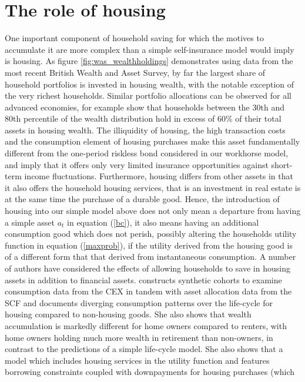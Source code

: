 \section{The role of housing}\label{housing}
One important component of household saving for which the motives to accumulate
it are more complex than a simple self-insurance model would imply is housing. 
As figure \ref{fig:was_wealthholdings} demonstrates using data from the most 
recent British Wealth and Asset Survey, by far the largest share of household
portfolios is invested in housing wealth, with the notable exception of the
very richest households. Similar portfolio allocations can be observed for all
advanced economies, \citet{FernandezVillaverdeKrueger2011} for example show that
households between the 30th and 80th percentile of the wealth distribution hold
in excess of 60\% of their total assets in housing wealth. The illiquidity of 
housing, the high transaction costs and the consumption element of housing 
purchases make this asset fundamentally different from the one-period riskless 
bond considered in our workhorse model, and imply that it offers only very limited
insurance opportunities against short-term income fluctuations. Furthermore, 
housing differs from other assets in that it also offers the household housing
services, that is an investment in real estate is at the same time the purchase
of a durable good. Hence, the introduction of housing into our simple model
above does not only mean a departure from having a simple asset $a_t$ in 
equation (\ref{bc}), it also means having an additional consumption good which 
does not perish, possibly altering the households utility function in equation
(\ref{maxprob}), if the utility derived from the housing good is of a different 
form that that derived from instantaneous consumption. 
A number of authors have considered the effects of allowing households to save
in housing assets in addition to financial assets. \citet{Yang2009} constructs
synthetic cohorts to examine consumption data from the CEX in tandem with asset
allocation data from the SCF and documents diverging consumption patterns over 
the life-cycle for housing compared to non-housing goods. She also shows that
wealth accumulation is markedly different for home owners compared to renters,
with home owners holding much more wealth in retirement than non-owners, in 
contrast to the predictions of a simple life-cycle model. She also shows that
a model which includes housing services in the utility function and features
borrowing constraints coupled with downpayments for housing purchases (which 
